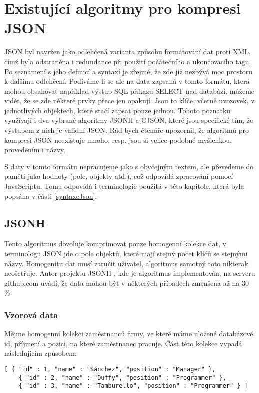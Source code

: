 \chapter{Existující algoritmy pro kompresi JSON}
\label{kapitolaJsonAlgoritmy}

JSON byl navržen jako odlehčená varianta způsobu formátování dat proti XML, čímž byla odstraněna i redundance při použití počátečního a ukončovacího tagu. Po seznámení s jeho definicí a syntaxí je zřejmé, že zde již nezbývá moc prostoru k dalšímu odlehčení. Podíváme-li se ale na data zapsaná v tomto formátu, která mohou obsahovat například výstup SQL příkazu SELECT nad databází, můžeme vidět, že se zde některé prvky přece jen opakují. Jsou to klíče, včetně uvozovek, v jednotlivých objektech, které stačí zapsat pouze jednou. Tohoto poznatku využívají i dva vybrané algoritmy JSONH a CJSON, které jsou specifické tím, že výstupem z nich je validní JSON. Rád bych čtenáře upozornil, že algoritmů pro kompresi JSON neexistuje mnoho, resp. jsou si velice podobné myšlenkou, provedením i názvy.

S daty v tomto formátu nepracujeme jako s obyčejným textem, ale převedeme do paměti jako hodnoty (pole, objekty atd.), což odpovídá zpracování pomocí JavaScriptu. Tomu odpovídá i terminologie použitá v této kapitole, která byla popsána v části \ref{syntaxeJson}.

\section{JSONH}
\label{jsonh}
Tento algoritmus dovoluje komprimovat pouze homogenní kolekce dat, v terminologii JSON jde o pole objektů, které mají stejný počet klíčů se stejnými názvy. Homogenitu dat musí zaručit uživatel, algoritmus samotný toto nikterak neošetřuje. Autor projektu JSONH \cite{jsonh}, kde je algoritmus implementován, na serveru github.com uvádí, že data mohou být v některých případech zmenšena až na 30 \%.

\subsection{Vzorová data}
Mějme homogenní kolekci zaměstnanců firmy, ve které máme uložené databázové id, příjmení a pozici, na které zaměstnanec pracuje. Část této kolekce vypadá následujícím způsobem:

\begin{verbatim}
[ { "id" : 1, "name" : "Sánchez", "position" : "Manager" },
    { "id" : 2, "name" : "Duffy", "position" : "Programmer" },
    { "id" : 3, "name" : "Tamburello", "position" : "Programmer" } ]
\end{verbatim}

